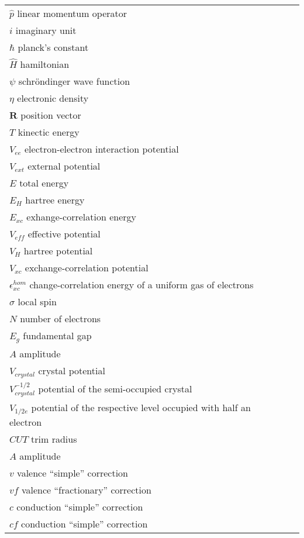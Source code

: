 \begin{longtable}{ll}

$\hat{p}$ linear momentum operator \\
$i$ imaginary unit \\
$\hbar$ planck's constant \\
$\hat{H}$ hamiltonian \\
$\psi$ schröndinger wave function \\
$\eta$ electronic density \\
$\textbf{R}$ position vector \\
$T$ kinectic energy \\
$V_{ee}$ electron-electron interaction potential \\
$V_{ext}$ external potential \\
$E$ total energy \\
$E_{H}$ hartree energy \\
$E_{xc}$ exhange-correlation energy \\
$V_{eff}$ effective potential \\
$V_{H}$ hartree potential \\
$V_{xc}$ exchange-correlation potential \\
$\epsilon_{xc}^{hom}$ change-correlation energy of a uniform gas of electrons\\
$\sigma$ local spin \\
$N$ number of electrons \\
$E_{g}$ fundamental gap \\
$A$ amplitude \\
$V_{crystal}$ crystal potential \\
$V_{crystal}^{-1/2}$ potential of the semi-occupied crystal \\
$V_{1/2e}$ potential of the respective level occupied
with half an electron \\
$CUT$ trim radius \\
$A$ amplitude \\
$v$ valence ``simple''  correction \\
$vf$ valence ``fractionary''  correction \\
$c$ conduction ``simple''  correction \\
$cf$ conduction ``simple''  correction\\


\end{longtable}